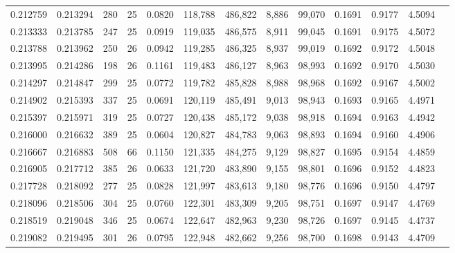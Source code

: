 \begin{tabular}{rrrrrrrrrrrrr}
0.212759 & 0.213294 &    280 &    25 &                                     0.0820 & 118,788 & 486,822 &   8,886 &  99,070 & 0.1691 & 0.9177 & 4.5094 \\
0.213333 & 0.213785 &    247 &    25 &                                     0.0919 & 119,035 & 486,575 &   8,911 &  99,045 & 0.1691 & 0.9175 & 4.5072 \\
0.213788 & 0.213962 &    250 &    26 &                                     0.0942 & 119,285 & 486,325 &   8,937 &  99,019 & 0.1692 & 0.9172 & 4.5048 \\
0.213995 & 0.214286 &    198 &    26 &                                     0.1161 & 119,483 & 486,127 &   8,963 &  98,993 & 0.1692 & 0.9170 & 4.5030 \\
0.214297 & 0.214847 &    299 &    25 &                                     0.0772 & 119,782 & 485,828 &   8,988 &  98,968 & 0.1692 & 0.9167 & 4.5002 \\
0.214902 & 0.215393 &    337 &    25 &                                     0.0691 & 120,119 & 485,491 &   9,013 &  98,943 & 0.1693 & 0.9165 & 4.4971 \\
0.215397 & 0.215971 &    319 &    25 &                                     0.0727 & 120,438 & 485,172 &   9,038 &  98,918 & 0.1694 & 0.9163 & 4.4942 \\
0.216000 & 0.216632 &    389 &    25 &                                     0.0604 & 120,827 & 484,783 &   9,063 &  98,893 & 0.1694 & 0.9160 & 4.4906 \\
0.216667 & 0.216883 &    508 &    66 &                                     0.1150 & 121,335 & 484,275 &   9,129 &  98,827 & 0.1695 & 0.9154 & 4.4859 \\
0.216905 & 0.217712 &    385 &    26 &                                     0.0633 & 121,720 & 483,890 &   9,155 &  98,801 & 0.1696 & 0.9152 & 4.4823 \\
0.217728 & 0.218092 &    277 &    25 &                                     0.0828 & 121,997 & 483,613 &   9,180 &  98,776 & 0.1696 & 0.9150 & 4.4797 \\
0.218096 & 0.218506 &    304 &    25 &                                     0.0760 & 122,301 & 483,309 &   9,205 &  98,751 & 0.1697 & 0.9147 & 4.4769 \\
0.218519 & 0.219048 &    346 &    25 &                                     0.0674 & 122,647 & 482,963 &   9,230 &  98,726 & 0.1697 & 0.9145 & 4.4737 \\
0.219082 & 0.219495 &    301 &    26 &                                     0.0795 & 122,948 & 482,662 &   9,256 &  98,700 & 0.1698 & 0.9143 & 4.4709 \\

\end{tabular}
